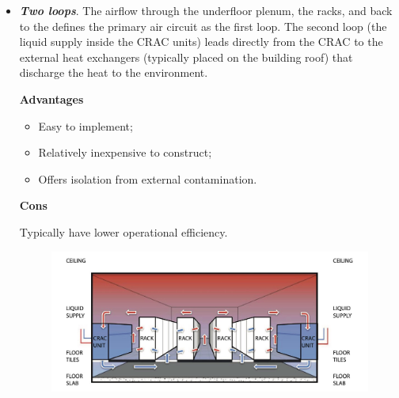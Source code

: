 \begin{itemize}
	\item \textbf{\emph{Two loops}}. The airflow through the underfloor plenum, the racks, and back to the  defines the primary air circuit as the first loop. The second loop (the liquid supply inside the CRAC units) leads directly from the CRAC to the external heat exchangers (typically placed on the building roof) that discharge the heat to the environment.
	\begin{flushleft}
		\textcolor{Green3}{ \textbf{Advantages}}
	\end{flushleft}
	\begin{itemize}
		\item Easy to implement;
		\item Relatively inexpensive to construct;
		\item Offers isolation from external contamination.
	\end{itemize}
	\begin{flushleft}
		\textcolor{Red2}{ \textbf{Cons}}
	\end{flushleft}
	Typically have lower operational efficiency.
	\begin{figure}[!htp]
		\centering
		\includegraphics[width=\textwidth]{img/components-dc-3.png}
	\end{figure}
	\newpage
	

\end{itemize}
